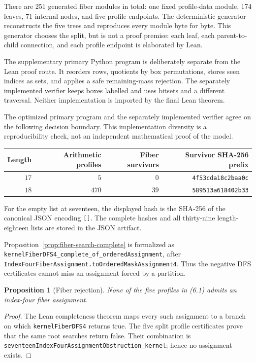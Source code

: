 \documentclass[11pt]{article}
\newtheorem{proposition}[theorem]{Proposition}
\theoremstyle{definition}
\newcommand{\leanname}[1]{\nolinkurl{#1}}
\begin{document}
There are 251 generated fiber modules in total: one fixed profile-data module,
174 leaves, 71 internal nodes, and five profile endpoints. The deterministic
generator reconstructs the five trees and reproduces every module byte for
byte. This generator chooses the split, but is not a proof premise: each leaf,
each parent-to-child connection, and each profile endpoint is elaborated by
Lean.

The supplementary primary Python program is deliberately separate from the
Lean proof route. It reorders rows, quotients by box permutations, stores seen
indices as sets, and applies a safe remaining-mass rejection. The separately
implemented verifier keeps boxes labelled and uses bitsets and a different
traversal. Neither implementation is imported by the final Lean theorem.

The optimized primary program and the separately implemented verifier agree
on the following decision boundary. This implementation diversity is a
reproducibility check, not an independent mathematical proof of the model.

\begin{center}
\begin{tabular}{@{}rrrr@{}}
\toprule
Length & Arithmetic profiles & Fiber survivors & Survivor SHA-256 prefix \\
\midrule
$17$ & $5$ & $0$ & \texttt{4f53cda18c2baa0c} \\
$18$ & $470$ & $39$ & \texttt{589513a618402b33} \\
\bottomrule
\end{tabular}
\end{center}

For the empty list at seventeen, the displayed hash is the SHA-256 of the
canonical JSON encoding \texttt{[]}. The complete hashes and all thirty-nine
length-eighteen lists are stored in the JSON artifact.

Proposition~\ref{prop:fiber-search-complete} is formalized as
\leanname{kernelFiberDFS4_complete_of_orderedAssignment}, after
\leanname{IndexFourFiberAssignment.toOrderedMaskAssignment4}. Thus the
negative DFS certificates cannot miss an assignment forced by a partition.

\begin{proposition}[Fiber rejection]\label{prop:fiber-rejection}
None of the five profiles in \emph{(6.1)} admits an index-four fiber
assignment.
\end{proposition}

\begin{proof}
The Lean completeness theorem maps every such assignment to a branch on which
\leanname{kernelFiberDFS4} returns true. The five split profile certificates
prove that the same root searches return false. Their combination is
\leanname{seventeenIndexFourAssignmentObstruction_kernel}; hence no assignment
exists.
\end{proof}
\end{document}

